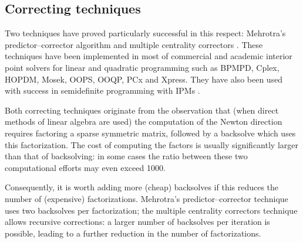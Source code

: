 
%
%
\subsection{Correcting techniques}

Two techniques have proved particularly successful in this respect:
Mehrotra's predictor--corrector algorithm \cite{Mehrotra92} 
and multiple centrality correctors \cite{Gondzio96}. These 
techniques have been implemented in most of commercial and academic 
interior point solvers for linear and quadratic programming such 
as BPMPD, Cplex, HOPDM, Mosek, OOPS, OOQP, PCx and Xpress. 
They have also been used with success in semidefinite 
programming with IPMs \cite{Haeberly99}.

Both correcting techniques originate from the observation that 
(when direct methods of linear algebra are used) the computation 
of the Newton direction requires factoring a sparse symmetric matrix, 
followed by a backsolve which uses this factorization. 
The cost of computing the factors is usually significantly larger than that 
of backsolving: in some cases the ratio between these two computational 
efforts may even exceed 1000. 


Consequently, it is worth adding more (cheap) 
backsolves if this reduces the number of (expensive) factorizations. 
Mehrotra's predictor--corrector technique \cite{Mehrotra92} uses two 
backsolves per factorization; the multiple centrality correctors technique
\cite{Gondzio96} allows recursive corrections: a larger number 
of backsolves per iteration is possible, leading to a further reduction 
in the number of factorizations. 


